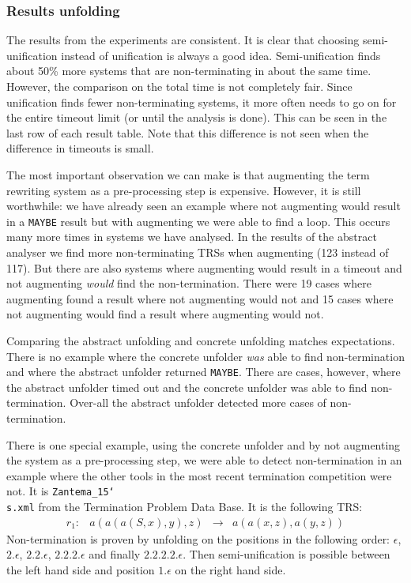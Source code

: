 \subsubsection{Results unfolding}
The results from the experiments are consistent. It is clear that choosing semi-unification instead of unification is always a good idea. Semi-unification finds about 50\% more systems that are non-terminating in about the same time. However, the comparison on the total time is not completely fair. Since unification finds fewer non-terminating systems, it more often needs to go on for the entire timeout limit (or until the analysis is done). This can be seen in the last row of each result table. Note that this difference is not seen when the difference in timeouts is small. 

The most important observation we can make is that augmenting the term rewriting system as a pre-processing step is expensive. However, it is still worthwhile: we have already seen an example where not augmenting would result in a \texttt{MAYBE} result but with augmenting we were able to find a loop. This occurs many more times in systems we have analysed. In the results of the abstract analyser we find more non-terminating TRSs when augmenting (123 instead of 117). But there are also systems where augmenting would result in a timeout and not augmenting \textit{would} find the non-termination. There were 19 cases where augmenting found a result where not augmenting would not and 15 cases where not augmenting would find a result where augmenting would not.

Comparing the abstract unfolding and concrete unfolding matches expectations. There is no example where the concrete unfolder \textit{was} able to find non-termination and where the abstract unfolder returned \texttt{MAYBE}. There are cases, however, where the abstract unfolder timed out and the concrete unfolder was able to find non-termination. Over-all the abstract unfolder detected more cases of non-termination. 

There is one special example, using the concrete unfolder and by not augmenting the system as a pre-processing step, we were able to detect non-termination in an example where the other tools in the most recent termination competition were not. It is \texttt{Zantema\_15\char`\\s.xml} from the Termination Problem Data Base. It is the following TRS:
\[
\begin{array}{lrcl}
    r_1: & a(a(a(S, x), y), z) & \rightarrow & a(a(x, z), a(y, z)) 
\end{array}
\]
Non-termination is proven by unfolding on the positions in the following order: $\epsilon$, $2.\epsilon$, $2.2.\epsilon$, $2.2.2.\epsilon$ and finally $2.2.2.2.\epsilon$. Then semi-unification is possible between the left hand side and position $1.\epsilon$ on the right hand side. 

